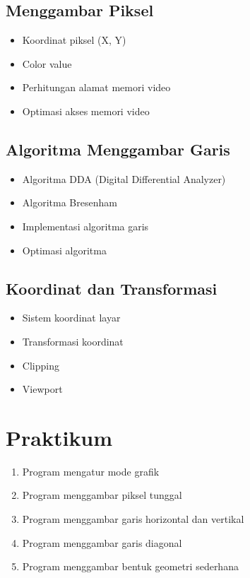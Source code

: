 \subsection{Menggambar Piksel}
\begin{itemize}
\item Koordinat piksel (X, Y)
\item Color value
\item Perhitungan alamat memori video
\item Optimasi akses memori video
\end{itemize}

\subsection{Algoritma Menggambar Garis}
\begin{itemize}
\item Algoritma DDA (Digital Differential Analyzer)
\item Algoritma Bresenham
\item Implementasi algoritma garis
\item Optimasi algoritma
\end{itemize}

\subsection{Koordinat dan Transformasi}
\begin{itemize}
\item Sistem koordinat layar
\item Transformasi koordinat
\item Clipping
\item Viewport
\end{itemize}

\section{Praktikum}
\begin{enumerate}
\item Program mengatur mode grafik
\item Program menggambar piksel tunggal
\item Program menggambar garis horizontal dan vertikal
\item Program menggambar garis diagonal
\item Program menggambar bentuk geometri sederhana
\end{enumerate}

